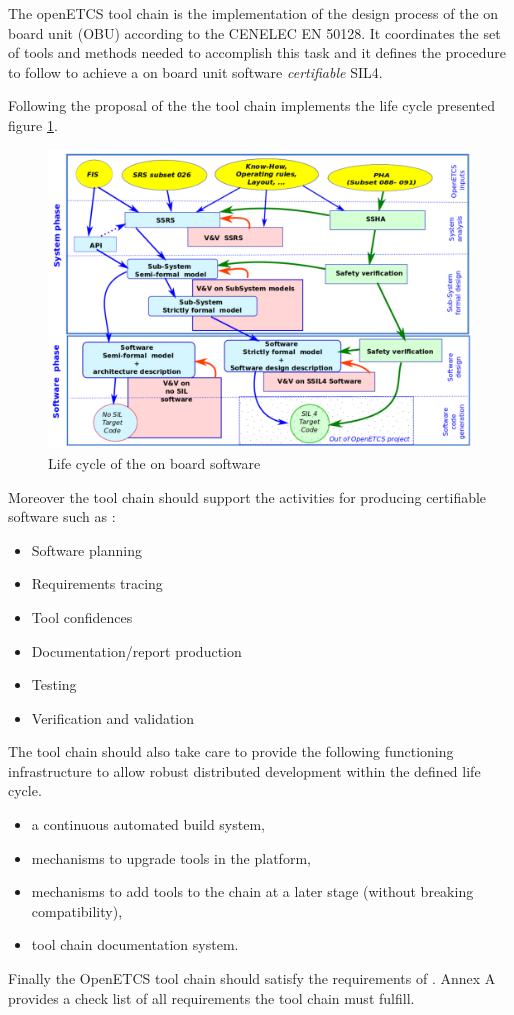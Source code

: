 
The openETCS tool chain is the implementation of the design process of
the on board unit  (\gls{OBU}) according to the CENELEC EN 50128.
It coordinates the set of tools and methods needed to accomplish this
task and it defines the procedure to follow  to achieve a on board
unit software {\em certifiable} \gls{SIL}4.

Following the proposal of the \cite{D2.3} the tool chain implements
the  life cycle presented figure \ref{fig:lifecycle}.
\begin{figure}
\includegraphics[width=\textwidth]{WholeProcess}
\caption{\label{fig:lifecycle} Life cycle of the on board software}
\end{figure}

Moreover the tool chain should support the activities for producing
certifiable software such as :
\begin{itemize}
\item Software planning
\item Requirements tracing
\item Tool confidences 
\item Documentation/report production
\item Testing 
\item Verification and validation
\end{itemize}

The tool chain should also take care to provide the following
functioning infrastructure to allow robust distributed development
within the defined life cycle. 
\begin{itemize}
\item a continuous automated build system,
\item  mechanisms to upgrade tools in the platform,
\item  mechanisms to add tools to the chain at a later stage (without breaking compatibility),
\item  tool chain documentation system.
\end{itemize}

Finally the OpenETCS tool chain  should satisfy the requirements of
\cite{D2.6}. Annex A provides a check list of all requirements the
tool chain must fulfill.


